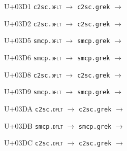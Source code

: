\documentclass{article}
\begin{document}
\begin{substitutions}
\goodbreak

U+03D1  \linebreak
    \texttt{c2sc.\textsc{dflt}} $\to$  \linebreak
    \texttt{c2sc.grek} $\to$  

\goodbreak

U+03D2  \linebreak
    \texttt{c2sc.\textsc{dflt}} $\to$  \linebreak
    \texttt{c2sc.grek} $\to$  

\goodbreak

U+03D5  \linebreak
    \texttt{smcp.\textsc{dflt}} $\to$  \linebreak
    \texttt{smcp.grek} $\to$  

\goodbreak

U+03D6  \linebreak
    \texttt{smcp.\textsc{dflt}} $\to$  \linebreak
    \texttt{smcp.grek} $\to$  

\goodbreak

U+03D8  \linebreak
    \texttt{c2sc.\textsc{dflt}} $\to$  \linebreak
    \texttt{c2sc.grek} $\to$  

\goodbreak

U+03D9  \linebreak
    \texttt{smcp.\textsc{dflt}} $\to$  \linebreak
    \texttt{smcp.grek} $\to$  

\goodbreak

U+03DA  \linebreak
    \texttt{c2sc.\textsc{dflt}} $\to$  \linebreak
    \texttt{c2sc.grek} $\to$  

\goodbreak

U+03DB  \linebreak
    \texttt{smcp.\textsc{dflt}} $\to$  \linebreak
    \texttt{smcp.grek} $\to$  

\goodbreak

U+03DC  \linebreak
    \texttt{c2sc.\textsc{dflt}} $\to$  \linebreak
    \texttt{c2sc.grek} $\to$  


\end{substitutions}
\end{document}
